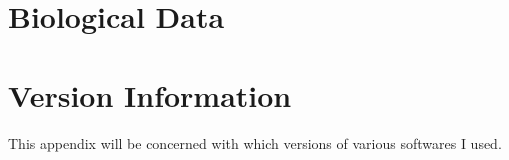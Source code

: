 \documentclass[12pt,twoside]{reedthesis}
\theoremstyle{definition}
\begin{document}
      \chapter{Biological Data}

      \chapter{Version Information}

      This appendix will be concerned with which versions of various softwares I used.



  \backmatter %

    \nocite{*}


%  
 

\end{document}
